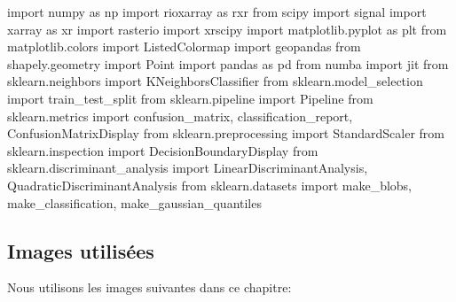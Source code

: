 \documentclass[
  french,
  11pt,
  letterpaper,
  open=any,
  twoside=false,
  french]{scrbook}
\newenvironment{Shaded}{\begin{snugshade}}{\end{snugshade}}
\newcommand{\ImportTok}[1]{\textcolor[rgb]{0.00,0.46,0.62}{#1}}
\newcommand{\NormalTok}[1]{\textcolor[rgb]{0.00,0.23,0.31}{#1}}
\begin{document}
\begin{Shaded}
\begin{Highlighting}[]
\ImportTok{import}\NormalTok{ numpy }\ImportTok{as}\NormalTok{ np}
\ImportTok{import}\NormalTok{ rioxarray }\ImportTok{as}\NormalTok{ rxr}
\ImportTok{from}\NormalTok{ scipy }\ImportTok{import}\NormalTok{ signal}
\ImportTok{import}\NormalTok{ xarray }\ImportTok{as}\NormalTok{ xr}
\ImportTok{import}\NormalTok{ rasterio}
\ImportTok{import}\NormalTok{ xrscipy}
\ImportTok{import}\NormalTok{ matplotlib.pyplot }\ImportTok{as}\NormalTok{ plt}
\ImportTok{from}\NormalTok{ matplotlib.colors }\ImportTok{import}\NormalTok{ ListedColormap}
\ImportTok{import}\NormalTok{ geopandas}
\ImportTok{from}\NormalTok{ shapely.geometry }\ImportTok{import}\NormalTok{ Point}
\ImportTok{import}\NormalTok{ pandas }\ImportTok{as}\NormalTok{ pd}
\ImportTok{from}\NormalTok{ numba }\ImportTok{import}\NormalTok{ jit}
\ImportTok{from}\NormalTok{ sklearn.neighbors }\ImportTok{import}\NormalTok{ KNeighborsClassifier}
\ImportTok{from}\NormalTok{ sklearn.model\_selection }\ImportTok{import}\NormalTok{ train\_test\_split}
\ImportTok{from}\NormalTok{ sklearn.pipeline }\ImportTok{import}\NormalTok{ Pipeline}
\ImportTok{from}\NormalTok{ sklearn.metrics }\ImportTok{import}\NormalTok{ confusion\_matrix, classification\_report, ConfusionMatrixDisplay}
\ImportTok{from}\NormalTok{ sklearn.preprocessing }\ImportTok{import}\NormalTok{ StandardScaler}
\ImportTok{from}\NormalTok{ sklearn.inspection }\ImportTok{import}\NormalTok{ DecisionBoundaryDisplay}
\ImportTok{from}\NormalTok{ sklearn.discriminant\_analysis }\ImportTok{import}\NormalTok{ LinearDiscriminantAnalysis, QuadraticDiscriminantAnalysis}
\ImportTok{from}\NormalTok{ sklearn.datasets }\ImportTok{import}\NormalTok{ make\_blobs, make\_classification, make\_gaussian\_quantiles}
\end{Highlighting}
\end{Shaded}

\subsection{Images utilisées}\label{images-utilisuxe9es-2}

Nous utilisons les images suivantes dans ce chapitre:
\end{document}

